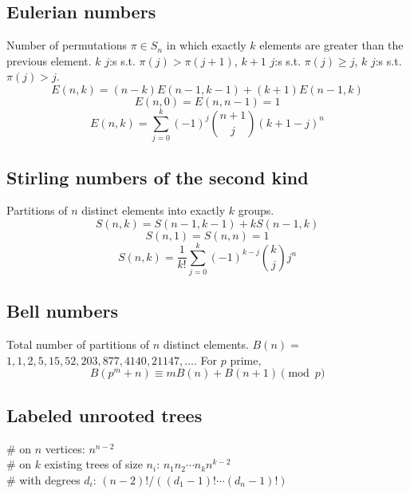 	\subsection{Eulerian numbers}
		Number of permutations $\pi \in S_n$ in which exactly $k$ elements are greater than the previous element. $k$ $j$:s s.t. $\pi(j)>\pi(j+1)$, $k+1$ $j$:s s.t. $\pi(j)\geq j$, $k$ $j$:s s.t. $\pi(j)>j$.
		$$E(n,k) = (n-k)E(n-1,k-1) + (k+1)E(n-1,k)$$
		$$E(n,0) = E(n,n-1) = 1$$
		$$E(n,k) = \sum_{j=0}^k(-1)^j\binom{n+1}{j}(k+1-j)^n$$

	\subsection{Stirling numbers of the second kind}
		Partitions of $n$ distinct elements into exactly $k$ groups.
		$$S(n,k) = S(n-1,k-1) + k S(n-1,k)$$
		$$S(n,1) = S(n,n) = 1$$
		$$S(n,k) = \frac{1}{k!}\sum_{j=0}^k (-1)^{k-j}\binom{k}{j}j^n$$

	\subsection{Bell numbers}
		Total number of partitions of $n$ distinct elements. $B(n) =$
		$1, 1, 2, 5, 15, 52, 203, 877, 4140, 21147, \dots$. For $p$ prime,
		\[ B(p^m+n)\equiv mB(n)+B(n+1) \pmod{p} \]

	\subsection{Labeled unrooted trees}
		\# on $n$ vertices: $n^{n-2}$ \\
		\# on $k$ existing trees of size $n_i$: $n_1n_2\cdots n_k n^{k-2}$ \\
		\# with degrees $d_i$: $(n-2)! / ((d_1-1)! \cdots (d_n-1)!)$

